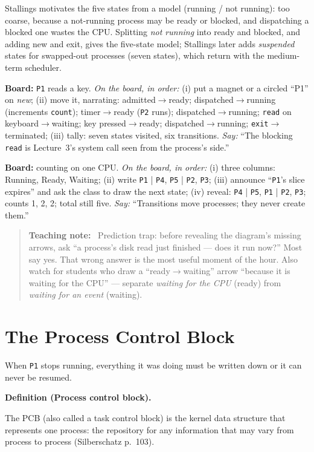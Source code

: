 \documentclass[11pt]{article}
\newenvironment{definitionbox}[1]{%
  \par\noindent\textbf{Definition (#1).}\ \itshape
}{\par\vspace{0.3em}}
\newenvironment{teachingaside}{\begin{quote}\small\color{primary-gold}\textbf{Teaching note:}\ }{\end{quote}}
\begin{document}
Stallings motivates the five states from a  model (running / not running): too coarse, because a not-running process may be ready or blocked, and dispatching a blocked one wastes the CPU. Splitting \emph{not running} into ready and blocked, and adding new and exit, gives the five-state model; Stallings later adds \emph{suspended} states for swapped-out processes (seven states), which return with the medium-term scheduler.

\textbf{Board:} \texttt{P1} reads a key. \emph{On the board, in order:} (i) put a magnet or a circled ``P1'' on \emph{new}; (ii) move it, narrating: admitted$\to$ready; dispatched$\to$running (increments \texttt{count}); timer$\to$ready (\texttt{P2} runs); dispatched$\to$running; \texttt{read} on keyboard$\to$waiting; key pressed$\to$ready; dispatched$\to$running; \texttt{exit}$\to$terminated; (iii) tally: seven states visited, six transitions. \emph{Say:} ``The blocking \texttt{read} is Lecture~3's system call seen from the process's side.''

\textbf{Board:} counting on one CPU. \emph{On the board, in order:} (i) three columns: Running, Ready, Waiting; (ii) write \texttt{P1} | \texttt{P4}, \texttt{P5} | \texttt{P2}, \texttt{P3}; (iii) announce ``\texttt{P1}'s slice expires'' and ask the class to draw the next state; (iv) reveal: \texttt{P4} | \texttt{P5}, \texttt{P1} | \texttt{P2}, \texttt{P3}; counts 1, 2, 2; total still five. \emph{Say:} ``Transitions move processes; they never create them.''

\begin{teachingaside}
Prediction trap: before revealing the diagram's missing arrows, ask ``a process's disk read just finished --- does it run now?'' Most say yes. That wrong answer is the most useful moment of the hour. Also watch for students who draw a ``ready$\to$waiting'' arrow ``because it is waiting for the CPU'' --- separate \emph{waiting for the CPU} (ready) from \emph{waiting for an event} (waiting).
\end{teachingaside}

\section{The Process Control Block}

When \texttt{P1} stops running, everything it was doing must be written down or it can never be resumed.

\begin{definitionbox}{Process control block}
The PCB (also called a task control block) is the kernel data structure that represents one process: the repository for any information that may vary from process to process (Silberschatz p.~103).
\end{definitionbox}
\end{document}
